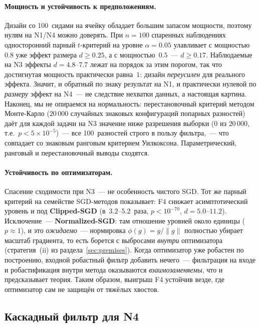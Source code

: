 \documentclass[conference]{IEEEtran}
\begin{document}
\paragraph{Мощность и устойчивость к предположениям.} Дизайн со 100~сидами
на ячейку обладает большим запасом мощности, поэтому нулям на N1/N4 можно
доверять. При $n=100$ спаренных наблюдениях
односторонний парный $t$-критерий на уровне $\alpha=0.05$ улавливает
с мощностью~$0.8$ уже эффект размера $d\ge0.25$, а с мощностью~$0.5$~---
$d\ge0.17$. Наблюдаемые на N3 эффекты $d=4.8$--$7.7$ лежат на порядок за этим
порогом, так что достигнутая мощность практически равна~$1$: дизайн
\emph{переусилен} для реального эффекта. Значит, и обратный по знаку
результат на N1, и практически нулевой по \emph{размеру} эффект на N4~---
не следствие нехватки данных, а настоящая картина. Наконец, мы не
опираемся на нормальность: перестановочный критерий методом Монте-Карло
($20\,000$ случайных знаковых конфигураций попарных разностей) даёт для
каждой задачи на N3 значение ниже разрешения выборки ($0$ из $20\,000$,
т.е.\ $p<5\times10^{-5}$)~--- все 100~разностей строго в пользу фильтра,~---
что совпадает со знаковым ранговым критерием Уилкоксона. Параметрический,
ранговый и перестановочный выводы сходятся.

\paragraph{Устойчивость по оптимизаторам.} Спасение сходимости при N3~---
не особенность чистого SGD. Тот же парный критерий на семействе
SGD-методов показывает: F4 снижает асимптотический уровень и под
\textbf{Clipped-SGD} (в~$3.2$--$5.2$~раза, $p<10^{-70}$,
$d=5.0$--$11.2$). Исключение~--- \textbf{Normalized-SGD}: там отношение
уровней около единицы ($p\approx1$), и это \emph{ожидаемо}~---
нормировка $\phi(g)=g/\|g\|$ полностью убирает масштаб градиента, то есть
борется с выбросами \emph{внутри} оптимизатора (стратегия~(ii) из
раздела~\ref{sec:premises}). Когда оптимизатор уже робастен по построению,
входной робастный фильтр добавить нечего~--- фильтрация на входе и
робастификация внутри метода оказываются \emph{взаимозаменяемы}, что и
предсказывает теория. Таким образом, выигрыш F4 устойчив везде, где
оптимизатор сам не защищён от тяжёлых хвостов.

\subsection{Каскадный фильтр для N4}
\label{sec:cascade}
\end{document}
